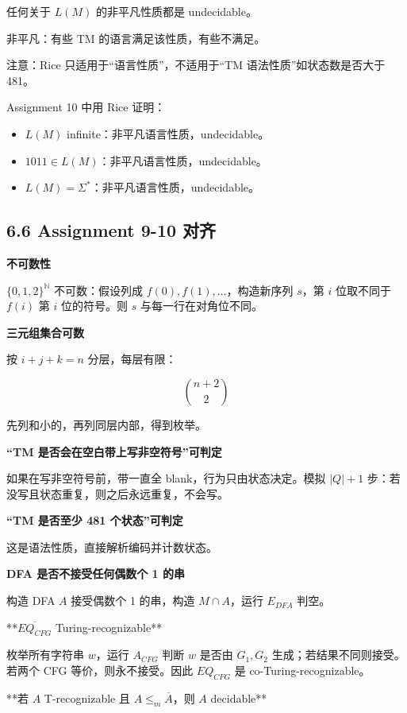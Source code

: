 ﻿\documentclass[UTF8,11pt]{ctexart}
\begin{document}
任何关于 \(L(M)\) 的非平凡性质都是 undecidable。  

非平凡：有些 TM 的语言满足该性质，有些不满足。  

注意：Rice 只适用于“语言性质”，不适用于“TM 语法性质”如状态数是否大于 481。


Assignment 10 中用 Rice 证明：


\begin{itemize}
\item \(L(M)\) infinite：非平凡语言性质，undecidable。
\item \(1011\in L(M)\)：非平凡语言性质，undecidable。
\item \(L(M)=\Sigma^*\)：非平凡语言性质，undecidable。
\end{itemize}


\subsection{6.6 Assignment 9-10 对齐}


\textbf{不可数性}


\(\{0,1,2\}^{\mathbb N}\) 不可数：假设列成 \(f(0),f(1),\ldots\)，构造新序列 \(s\)，第 \(i\) 位取不同于 \(f(i)\) 第 \(i\) 位的符号。则 \(s\) 与每一行在对角位不同。


\textbf{三元组集合可数}


按 \(i+j+k=n\) 分层，每层有限：

\[
\binom{n+2}{2}
\]

先列和小的，再列同层内部，得到枚举。


\textbf{“TM 是否会在空白带上写非空符号”可判定}


如果在写非空符号前，带一直全 blank，行为只由状态决定。模拟 \(|Q|+1\) 步：若没写且状态重复，则之后永远重复，不会写。


\textbf{“TM 是否至少 481 个状态”可判定}


这是语法性质，直接解析编码并计数状态。


\textbf{DFA 是否不接受任何偶数个 1 的串}


构造 DFA \(A\) 接受偶数个 1 的串，构造 \(M\cap A\)，运行 \(E_{DFA}\) 判空。


**\(\overline{EQ_{CFG}}\) Turing-recognizable**


枚举所有字符串 \(w\)，运行 \(A_{CFG}\) 判断 \(w\) 是否由 \(G_1,G_2\) 生成；若结果不同则接受。若两个 CFG 等价，则永不接受。因此 \(EQ_{CFG}\) 是 co-Turing-recognizable。


**若 \(A\) T-recognizable 且 \(A\le_m\overline A\)，则 \(A\) decidable**
\end{document}

